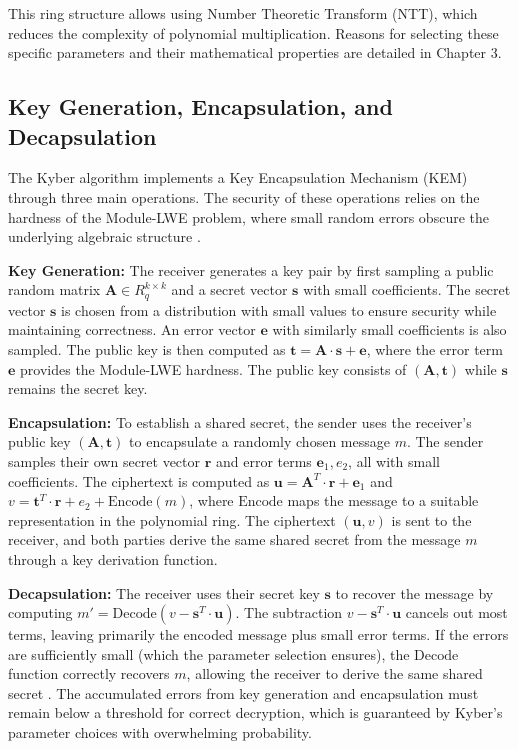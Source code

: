 This ring structure allows using Number Theoretic Transform (NTT), which reduces the complexity of polynomial multiplication. Reasons for selecting these specific parameters and their mathematical properties are detailed in Chapter 3.

\subsection{Key Generation, Encapsulation, and Decapsulation}

The Kyber algorithm implements a Key Encapsulation Mechanism (KEM) through three main operations. The security of these operations relies on the hardness of the Module-LWE problem, where small random errors obscure the underlying algebraic structure \cite{NIST-Selection}.

\textbf{Key Generation:} The receiver generates a key pair by first sampling a public random matrix $\mathbf{A} \in R_q^{k \times k}$ and a secret vector $\mathbf{s}$ with small coefficients. The secret vector $\mathbf{s}$ is chosen from a distribution with small values to ensure security while maintaining correctness. An error vector $\mathbf{e}$ with similarly small coefficients is also sampled. The public key is then computed as $\mathbf{t} = \mathbf{A} \cdot \mathbf{s} + \mathbf{e}$, where the error term $\mathbf{e}$ provides the Module-LWE hardness. The public key consists of $(\mathbf{A}, \mathbf{t})$ while $\mathbf{s}$ remains the secret key.

\textbf{Encapsulation:} To establish a shared secret, the sender uses the receiver's public key $(\mathbf{A}, \mathbf{t})$ to encapsulate a randomly chosen message $m$. The sender samples their own secret vector $\mathbf{r}$ and error terms $\mathbf{e}_1, e_2$, all with small coefficients. The ciphertext is computed as $\mathbf{u} = \mathbf{A}^T \cdot \mathbf{r} + \mathbf{e}_1$ and $v = \mathbf{t}^T \cdot \mathbf{r} + e_2 + \text{Encode}(m)$, where $\text{Encode}$ maps the message to a suitable representation in the polynomial ring. The ciphertext $(\mathbf{u}, v)$ is sent to the receiver, and both parties derive the same shared secret from the message $m$ through a key derivation function.

\textbf{Decapsulation:} The receiver uses their secret key $\mathbf{s}$ to recover the message by computing $m' = \text{Decode}(v - \mathbf{s}^T \cdot \mathbf{u})$. The subtraction $v - \mathbf{s}^T \cdot \mathbf{u}$ cancels out most terms, leaving primarily the encoded message plus small error terms. If the errors are sufficiently small (which the parameter selection ensures), the $\text{Decode}$ function correctly recovers $m$, allowing the receiver to derive the same shared secret \cite{Peikert2016}. The accumulated errors from key generation and encapsulation must remain below a threshold for correct decryption, which is guaranteed by Kyber's parameter choices with overwhelming probability.

